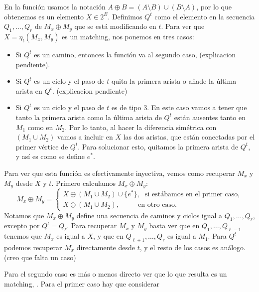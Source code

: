 \documentclass{article}
\begin{document}
	En la función usamos la notación $A \oplus B = (A \setminus B) \cup (B \setminus A)$, por lo que obtenemos es un elemento $X \in 2^E$. Definimos $Q^t$ como el elemento en la secuencia $Q_1,\ldots,Q_r$ de $M_x \oplus M_y$ que se está modificando en $t$. Para ver que $X = \eta_t(M_x, M_y)$ es un matching, nos ponemos en tres casos:
	\begin{itemize}
		\item Si $Q^t$ es un camino, entonces la función va al segundo caso, (explicacion pendiente).
		\item Si $Q^t$ es un ciclo y el paso de $t$ quita la primera arista o añade la última arista en $Q^t$.  (explicacion pendiente)
		\item Si $Q^t$ es un ciclo y el paso de $t$ es de tipo 3. En este caso vamos a tener que tanto la primera arista como la última arista de $Q^t$ están ausentes tanto en $M_1$ como en $M_2$. Por lo tanto, al hacer la diferencia simétrica con $(M_1 \cup M_2)$ vamos a incluir en $X$ las dos aristas, que están conectadas por el primer vértice de $Q^t$. Para solucionar esto, quitamos la primera arista de $Q^t$, y así es como se define $e^*$.
	\end{itemize}

	Para ver que esta función es efectivamente inyectiva, vemos como recuperar $M_x$ y $M_y$ desde $X$ y $t$. Primero calculamos $M_x \oplus M_y$:
	$$
	M_x \oplus M_y = \begin{cases}
		X\oplus (M_1 \cup M_2) \cup \{e^*\}, \ \ \ \text{si estábamos en el primer caso,}\\
		X\oplus (M_1 \cup M_2),\  \ \ \ \  \ \ \ \ \ \ \ \text{en otro caso.}
	\end{cases}
	$$
	Notamos que $M_x \oplus M_y$ define una secuencia de caminos y ciclos igual a $Q_1,\ldots,Q_r$, excepto por $Q^t = Q_{\ell}$. Para recuperar $M_x$ y $M_y$ basta ver que en $Q_1,\ldots,Q_{\ell-1}$ tenemos que $M_x$ es igual a $X$, y que en $Q_{\ell+1},\ldots,Q_r$ es igual a $M_1$. Para $Q^t$ podemos recuperar $M_x$ directamente desde $t$, y el resto de los casos es análogo. (creo que falta un caso)
	
	Para el segundo caso es más o menos directo ver que lo que resulta es un matching, . Para el primer caso hay que considerar 
\end{document}

